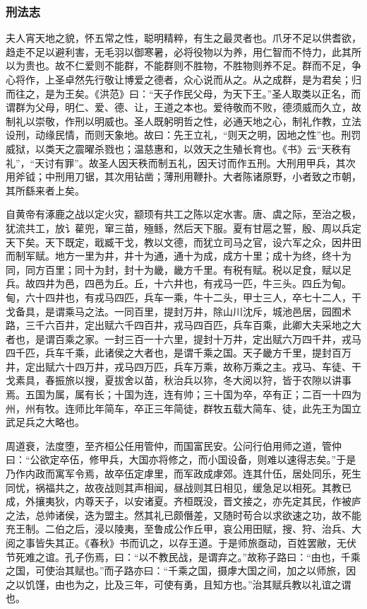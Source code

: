 \documentclass[]{article}
\begin{document}
\hypertarget{header-n1557}{%
\subsubsection{刑法志}\label{header-n1557}}

夫人宵天地之貌，怀五常之性，聪明精粹，有生之最灵者也。爪牙不足以供耆欲，趋走不足以避利害，无毛羽以御寒暑，必将役物以为养，用仁智而不恃力，此其所以为贵也。故不仁爱则不能群，不能群则不胜物，不胜物则养不足。群而不足，争心将作，上圣卓然先行敬让博爱之德者，众心说而从之。从之成群，是为君矣；归而往之，是为王矣。《洪范》曰：``天子作民父母，为天下王。''圣人取类以正名，而谓群为父母，明仁、爱、德、让，王道之本也。爱待敬而不败，德须威而久立，故制礼以崇敬，作刑以明威也。圣人既躬明哲之性，必通天地之心，制礼作教，立法设刑，动缘民情，而则天象地。故曰：先王立礼，``则天之明，因地之性''也。刑罚威狱，以类天之震曜杀戮也；温慈惠和，以效天之生殖长育也。《书》云``天秩有礼''，``天讨有罪''。故圣人因天秩而制五礼，因天讨而作五刑。大刑用甲兵，其次用斧钺；中刑用刀锯，其次用钻凿；薄刑用鞭扑。大者陈诸原野，小者致之市朝，其所繇来者上矣。

自黄帝有涿鹿之战以定火灾，颛顼有共工之陈以定水害。唐、虞之际，至治之极，犹流共工，放讠雚兜，窜三苗，殛鲧，然后天下服。夏有甘扈之誓，殷、周以兵定天下矣。天下既定，戢臧干戈，教以文德，而犹立司马之官，设六军之众，因井田而制军赋。地方一里为井，井十为通，通十为成，成方十里；成十为终，终十为同，同方百里；同十为封，封十为畿，畿方千里。有税有赋。税以足食，赋以足兵。故四井为邑，四邑为丘。丘，十六井也，有戎马一匹，牛三头。四丘为甸。甸，六十四井也，有戎马四匹，兵车一乘，牛十二头，甲士三人，卒七十二人，干戈备具，是谓乘马之法。一同百里，提封万井，除山川沈斥，城池邑居，园囿术路，三千六百井，定出赋六千四百井，戎马四百匹，兵车百乘，此卿大夫采地之大者也，是谓百乘之家。一封三百一十六里，提封十万井，定出赋六万四千井，戎马四千匹，兵车千乘，此诸侯之大者也，是谓千乘之国。天子畿方千里，提封百万井，定出赋六十四万井，戎马四万匹，兵车万乘，故称万乘之主。戎马、车徒、干戈素具，春振旅以搜，夏拔舍以苗，秋治兵以狝，冬大阅以狩，皆于农隙以讲事焉。五国为属，属有长；十国为连，连有帅；三十国为卒，卒有正；二百一十四为州，州有牧。连师比年简车，卒正三年简徒，群牧五载大简车、徒，此先王为国立武足兵之大略也。

周道衰，法度堕，至齐桓公任用管仲，而国富民安。公问行伯用师之道，管仲曰：``公欲定卒伍，修甲兵，大国亦将修之，而小国设备，则难以速得志矣。''于是乃作内政而寓军令焉，故卒伍定虖里，而军政成虖郊。连其什伍，居处同乐，死生同忧，祸福共之，故夜战则其声相闻，昼战则其日相见，缓急足以相死。其教已成，外攘夷狄，内尊天子，以安诸夏。齐桓既没，晋文接之，亦先定其民，作被庐之法，总帅诸侯，迭为盟主。然其礼已颇僭差，又随时苟合以求欲速之功，故不能充王制。二伯之后，浸以陵夷，至鲁成公作丘甲，哀公用田赋，搜、狩、治兵、大阅之事皆失其正。《春秋》书而讥之，以存王道。于是师旅亟动，百姓罢敝，无伏节死难之谊。孔子伤焉，曰：``以不教民战，是谓弃之。''故称子路曰：``由也，千乘之国，可使治其赋也。''而子路亦曰：``千乘之国，摄虖大国之间，加之以师旅，因之以饥馑，由也为之，比及三年，可使有勇，且知方也。''治其赋兵教以礼谊之谓也。
\end{document}
